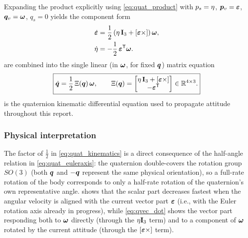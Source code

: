 Expanding the product explicitly using \cref{eq:quat_product} with $p_s = \eta$, $\bm{p}_v=\bm{\varepsilon}$, $\bm{q}_v = \bm{\omega}$, $q_s = 0$ yields the component form
\begin{align}
    \dot{\bm{\varepsilon}} &= \frac{1}{2}\left(\eta\,\mathbf{I}_3 + [\bm{\varepsilon}\times]\right)\bm{\omega}, \label{eq:qvec_dot}\\
    \dot{\eta} &= -\frac{1}{2}\,\bm{\varepsilon}^{\mathsf{T}}\bm{\omega}. \label{eq:qscalar_dot}
\end{align}
 are combined into the single linear (in $\bm{\omega}$, for fixed $\bm{q}$) matrix equation
\begin{equation}
    \boxed{\dot{\bm{q}} = \frac{1}{2}\,\Xi(\bm{q})\,\bm{\omega}, \qquad
    \Xi(\bm{q}) = \begin{bmatrix} \eta\,\mathbf{I}_3 + [\bm{\varepsilon}\times] \\ -\bm{\varepsilon}^{\mathsf{T}} \end{bmatrix} \in \mathbb{R}^{4\times3}.}
    \label{eq:quat_kinematics}
\end{equation}
 is the quaternion kinematic differential equation used to propagate attitude throughout this report.

\subsubsection{Physical interpretation}

The factor of $\tfrac{1}{2}$ in \cref{eq:quat_kinematics} is a direct consequence of the half-angle relation in \cref{eq:quat_euleraxis}: the quaternion double-covers the rotation group $SO(3)$ (both $\bm{q}$ and $-\bm{q}$ represent the same physical orientation), so a full-rate rotation of the body corresponds to only a half-rate rotation of the quaternion's own representative angle.  shows that the scalar part decreases fastest when the angular velocity is aligned with the current vector part $\bm{\varepsilon}$ (i.e., with the Euler rotation axis already in progress), while \cref{eq:qvec_dot} shows the vector part responding both to $\bm{\omega}$ directly (through the $\eta\mathbf{I}_3$ term) and to a component of $\bm{\omega}$ rotated by the current attitude (through the $[\bm{\varepsilon}\times]$ term).

